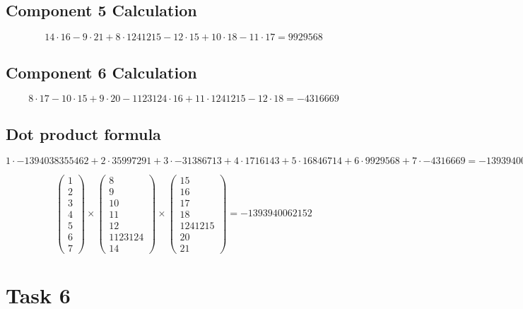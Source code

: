 \documentclass{article}
\begin{document}
\subsection*{ \vspace{1em} Component 5 Calculation}
\[
14 \cdot 16 - 9 \cdot 21 + 8 \cdot 1241215 - 12 \cdot 15 + 10 \cdot 18 - 11 \cdot 17 = 9929568
\]
\subsection*{ \vspace{1em} Component 6 Calculation}
\[
8 \cdot 17 - 10 \cdot 15 + 9 \cdot 20 - 1123124 \cdot 16 + 11 \cdot 1241215 - 12 \cdot 18 = -4316669
\]
\subsection*{ \vspace{1em} Dot product formula}
\[
1 \cdot -1394038355462 + 2 \cdot 35997291 + 3 \cdot -31386713 + 4 \cdot 1716143 + 5 \cdot 16846714 + 6 \cdot 9929568 + 7 \cdot -4316669 = -1393940062152
\]
\medskip

\[
\begin{pmatrix}1 \\ 2 \\ 3 \\ 4 \\ 5 \\ 6 \\ 7\end{pmatrix} \times \begin{pmatrix}8 \\ 9 \\ 10 \\ 11 \\ 12 \\ 1123124 \\ 14\end{pmatrix} \times \begin{pmatrix}15 \\ 16 \\ 17 \\ 18 \\ 1241215 \\ 20 \\ 21\end{pmatrix} = -1393940062152
\]
\bigskip

\hrulefill
\bigskip

\section*{Task 6}
\end{document}
